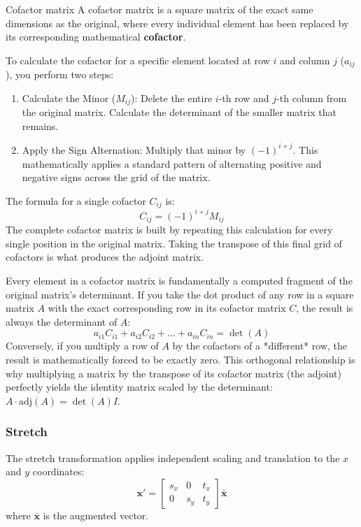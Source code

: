 \begin{definition}{Cofactor matrix}
A cofactor matrix is a square matrix of the exact same dimensions as the original, where every individual element has been replaced by its corresponding mathematical \textbf{cofactor}.

To calculate the cofactor for a specific element located at row $i$ and column $j$ ($a_{ij}$), you perform two steps:

\begin{enumerate}
\item Calculate the Minor ($M_{ij}$): Delete the entire $i$-th row and $j$-th column from the original matrix. Calculate the determinant of the smaller matrix that remains.
\item Apply the Sign Alternation: Multiply that minor by $(-1)^{i+j}$. This mathematically applies a standard  pattern of alternating positive and negative signs across the grid of the matrix.
\end{enumerate}

The formula for a single cofactor $C_{ij}$ is:
$$C_{ij} = (-1)^{i+j} M_{ij}$$
The complete cofactor matrix is built by repeating this calculation for every single position in the original matrix. Taking the transpose of this final grid of cofactors is what produces the adjoint matrix.

Every element in a cofactor matrix is fundamentally a computed fragment of the original matrix's determinant. If you take the dot product of any row in a square matrix $A$ with the exact corresponding row in its cofactor matrix $C$, the result is always the determinant of $A$:
$$a_{i1}C_{i1} + a_{i2}C_{i2} + \dots + a_{in}C_{in} = \det(A)$$
Conversely, if you multiply a row of $A$ by the cofactors of a *different* row, the result is mathematically forced to be exactly zero. This orthogonal relationship is why multiplying a matrix by the transpose of its cofactor matrix (the adjoint) perfectly yields the identity matrix scaled by the determinant: $A \cdot \text{adj}(A) = \det(A)I$.
\end{definition}

\subsubsection{Stretch}
The stretch transformation applies independent scaling and translation to the $x$ and $y$ coordinates:
$$\mathbf{x}'=\begin{bmatrix}
s_{x} & 0 & t_{x} \\
0 & s_{y} & t_{y}
\end{bmatrix} \bar{\mathbf{x}}$$
where $\bar{\mathbf{x}}$ is the augmented vector.

